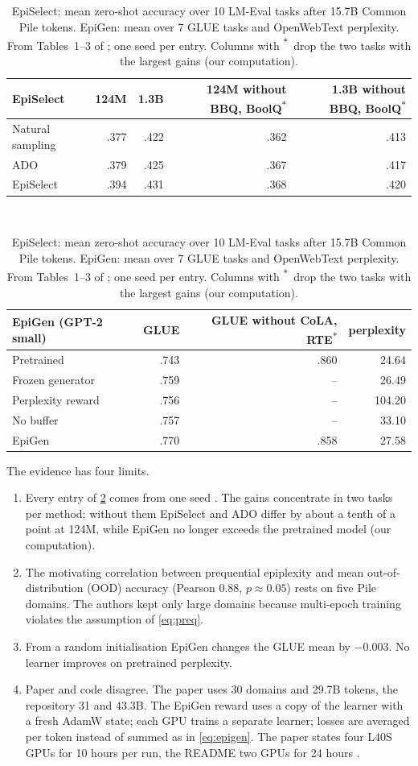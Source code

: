 \documentclass[11pt]{article}
\newcommand{\od}{\textsuperscript{$\ast$}}
\theoremstyle{tight}
\begin{document}
\begin{table}[!htb]
\centering\small
\caption{EpiSelect: mean zero-shot accuracy over 10 LM-Eval tasks after 15.7B Common Pile tokens.
EpiGen: mean over 7 GLUE tasks and OpenWebText perplexity. From Tables~1--3 of
\citet{su2026epiplexity}; one seed per entry. Columns with \od\ drop the two tasks with the largest
gains (our computation).}\label{tab:follow}
\begin{tabular}{@{}lrrrr@{}}
\toprule
EpiSelect & 124M & 1.3B & 124M without BBQ, BoolQ\od & 1.3B without BBQ, BoolQ\od \\
\midrule
Natural sampling & .377 & .422 & .362 & .413 \\
ADO & .379 & .425 & .367 & .417 \\
EpiSelect & .394 & .431 & .368 & .420 \\
\bottomrule
\end{tabular}\\[6pt]
\begin{tabular}{@{}lrrr@{}}
\toprule
EpiGen (GPT-2 small) & GLUE & GLUE without CoLA, RTE\od & perplexity \\
\midrule
Pretrained & .743 & .860 & 24.64 \\
Frozen generator & .759 & -- & 26.49 \\
Perplexity reward & .756 & -- & 104.20 \\
No buffer & .757 & -- & 33.10 \\
EpiGen & .770 & .858 & 27.58 \\
\bottomrule
\end{tabular}
\end{table}

The evidence has four limits.
\begin{enumerate}
\item Every entry of \cref{tab:follow} comes from one seed \citep{episelectcode,epigencode}. The gains
concentrate in two tasks per method; without them EpiSelect and ADO differ by about a tenth of a point
at 124M, while EpiGen no longer exceeds the pretrained model (our computation).
\item The motivating correlation between prequential epiplexity and mean out-of-distribution (OOD)
accuracy (Pearson 0.88,
$p\approx0.05$) rests on five Pile domains. The authors kept only large domains because multi-epoch
training violates the assumption of \eqref{eq:preq}.
\item From a random initialisation EpiGen changes the GLUE mean by $-0.003$. No learner improves on
pretrained perplexity.
\item Paper and code disagree. The paper uses 30 domains and 29.7B tokens, the repository 31 and 43.3B.
The EpiGen reward uses a copy of the learner with a fresh AdamW state; each GPU trains a separate
learner; losses are averaged per token instead of summed as in \eqref{eq:epigen}. The paper states four
L40S GPUs for 10 hours per run, the README two GPUs for 24 hours \citep{episelectcode,epigencode}.
\end{enumerate}
\end{document}
